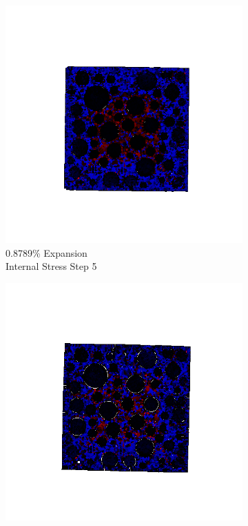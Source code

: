 \begin{figure}[h!]
    \begin{subfigure}{.25\textwidth}
      \centering
      \includegraphics[width=1.0\linewidth]{Files/exp_3D/DEF/A30X0C_4_s5.png}
      \caption{0.8789\% Expansion\\Internal Stress Step 5}
    \end{subfigure}%
    \begin{subfigure}{.25\textwidth}
      \centering
      \includegraphics[width=1.0\linewidth]{Files/exp_3D/DEF/A30X0C_4_s10.png}

\end{subfigure}
\end{figure}
